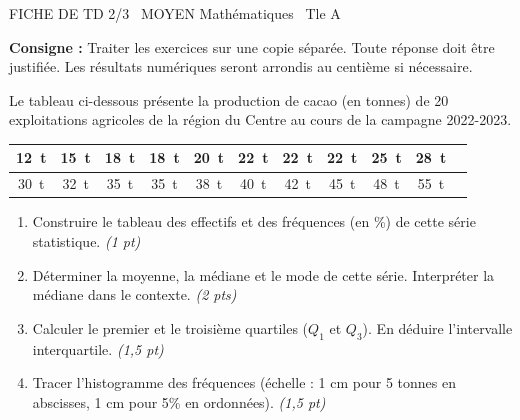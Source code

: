\documentclass[11pt]{article}
\begin{document}
\begin{tcolorbox}[enhanced,colback=popink,colframe=popink,arc=10pt,boxrule=0pt,left=12pt,right=12pt,top=9pt,bottom=9pt]
{\color{white}\popxbold\small FICHE DE TD 2/3 \textbullet\ MOYEN \hfill Mathématiques \textbullet\ Tle A\par}
\end{tcolorbox}
\vspace{4pt}
\noindent\textbf{Consigne :} Traiter les exercices sur une copie séparée. Toute réponse doit être justifiée. Les résultats numériques seront arrondis au centième si nécessaire.

\begin{exercice}
Le tableau ci-dessous présente la production de cacao (en tonnes) de 20 exploitations agricoles de la région du Centre au cours de la campagne 2022-2023.
\begin{center}
\begin{tabular}{|c|c|c|c|c|c|c|c|c|c|c|}
\hline
\SI{12}{t} & \SI{15}{t} & \SI{18}{t} & \SI{18}{t} & \SI{20}{t} & \SI{22}{t} & \SI{22}{t} & \SI{22}{t} & \SI{25}{t} & \SI{28}{t} \\ \hline
\SI{30}{t} & \SI{32}{t} & \SI{35}{t} & \SI{35}{t} & \SI{38}{t} & \SI{40}{t} & \SI{42}{t} & \SI{45}{t} & \SI{48}{t} & \SI{55}{t} \\ \hline
\end{tabular}
\end{center}
\begin{enumerate}
    \item Construire le tableau des effectifs et des fréquences (en \%) de cette série statistique. \textit{(1 pt)}
    \item Déterminer la moyenne, la médiane et le mode de cette série. Interpréter la médiane dans le contexte. \textit{(2 pts)}
    \item Calculer le premier et le troisième quartiles ($Q_1$ et $Q_3$). En déduire l'intervalle interquartile. \textit{(1,5 pt)}
    \item Tracer l'histogramme des fréquences (échelle : 1 cm pour 5 tonnes en abscisses, 1 cm pour 5\% en ordonnées). \textit{(1,5 pt)}
\end{enumerate}
\end{exercice}
\end{document}
